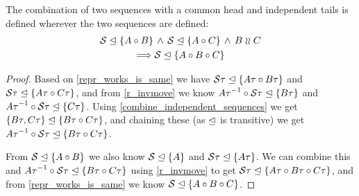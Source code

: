 \begin{mylem}\label{indep_prefix_combine}
The combination of two sequences with a common head and independent tails 
is defined wherever the two sequences are defined:
\begin{gather*}
 {\mathcal{S}}\trianglelefteq{\{{A\circ B}\}} \,\wedge\, {\mathcal{S}}\trianglelefteq{\{{A\circ C}\}} \,\wedge\, B\mathrel{\wr\wr} C \\
 \Longrightarrow {\mathcal{S}}\trianglelefteq{\{{A\circ B\circ C}\}}
\end{gather*}
\end{mylem}
\begin{proof}
Based on \cref{repr_works_is_same} we have
${\mathcal{S}\tau}\trianglelefteq{\{{A\tau\circ B\tau}\}}$ and ${\mathcal{S}\tau}\trianglelefteq{\{{A\tau\circ C\tau}\}}$,
and from \cref{r_invmove} we know
${{A\tau}^{-1}\circ \mathcal{S\tau}}\trianglelefteq{\{{B\tau}\}}$ 
and ${{A\tau}^{-1}\circ \mathcal{S\tau}}\trianglelefteq{\{{C\tau}\}}$.
Using \cref{combine_independent_sequences} we get
${\{{B\tau,C\tau}\}}\trianglelefteq{\{{B\tau\circ C\tau}\}}$,
and chaining these (as $\trianglelefteq$ is transitive)
we get
${{A\tau}^{-1}\circ \mathcal{S}\tau}\trianglelefteq{\{{B\tau\circ C\tau}\}}$.

From ${\mathcal{S}}\trianglelefteq{\{{A\circ B}\}}$ we also know ${\mathcal{S}}\trianglelefteq{\{{A}\}}$ and ${\mathcal{S}\tau}\trianglelefteq{\{{A\tau}\}}$.
We can combine this and ${{A\tau}^{-1}\circ \mathcal{S}\tau}\trianglelefteq{\{{B\tau\circ C\tau}\}}$ using
\cref{r_invmove} to get
${\mathcal{S}\tau}\trianglelefteq{\{{A\tau\circ B\tau\circ C\tau}\}}$, and from \cref{repr_works_is_same} we know
${\mathcal{S}}\trianglelefteq{\{{A\circ B\circ C}\}}$.
\end{proof}
